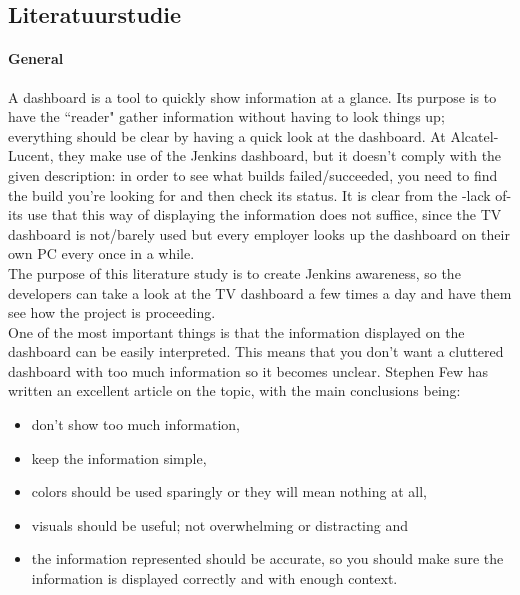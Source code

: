 \documentclass[10pt,a4paper]{article}
\begin{document}
\begin{appendices}
\section{Literatuurstudie}
\label{lit_study}


\paragraph{General}
A dashboard is a tool to quickly show information at a glance. Its purpose is to have the ``reader" gather information without having to look things up; everything should be clear by having a quick look at the dashboard. At Alcatel-Lucent, they make use of the Jenkins dashboard, but it doesn't comply with the given description: in order to see what builds failed/succeeded, you need to find the build you're looking for and then check its status. It is clear from the -lack of- its use that this way of displaying the information does not suffice, since the TV dashboard is not/barely used but every employer looks up the dashboard on their own PC every once in a while. \\

The purpose of this literature study is to create Jenkins awareness, so the developers can take a look at the TV dashboard a few times a day and have them see how the project is proceeding.\\
One of the most important things is that the information displayed on the dashboard can be easily interpreted. This means that you don't want a cluttered dashboard with too much information so it becomes unclear.
Stephen Few has written an excellent article on the topic, with the main conclusions being:
\begin{itemize}
\item don't show too much information,
\item keep the information simple,
\item colors should be used sparingly or they will mean nothing at all,
\item visuals should be useful; not overwhelming or distracting and
\item the information represented should be accurate, so you should make sure the information is displayed correctly and with enough context.
\end{itemize}
 

\end{appendices}
\end{document}
